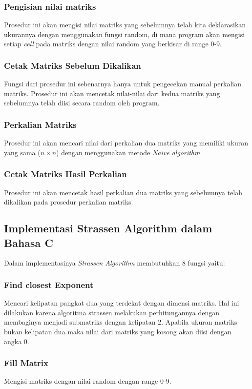 \documentclass[conference]{IEEEtran}
\begin{document}
\subsubsection{Pengisian nilai matriks}
Prosedur ini akan mengisi nilai matriks yang sebelumnya telah kita deklarasikan ukurannya dengan menggunakan fungsi random, 
di mana program akan mengisi setiap \textit{cell} pada matriks dengan nilai random yang berkisar di range 0-9.
\subsubsection{Cetak Matriks Sebelum Dikalikan}
Fungsi dari prosedur ini sebenarnya hanya untuk pengecekan manual perkalian matriks. 
Prosedur ini akan mencetak nilai-nilai dari kedua matriks yang sebelumnya telah diisi secara random oleh program.
\subsubsection{Perkalian Matriks}
Prosedur ini akan mencari nilai dari perkalian dua matriks yang memiliki ukuran yang sama ($n\times n$) dengan menggunakan metode \textit{Naive algorithm}.
\subsubsection{Cetak Matriks Hasil Perkalian}
Prosedur ini akan mencetak hasil perkalian dua matriks yang sebelumnya telah dikalikan pada prosedur perkalian matriks.

\subsection{Implementasi Strassen Algorithm dalam Bahasa C}
Dalam implementasinya \textit{Strassen Algorithm} membutuhkan 8 fungsi yaitu:

\subsubsection{Find closest Exponent} Mencari kelipatan pangkat dua yang terdekat dengan dimensi matriks. Hal ini dilakukan karena algoritma strassen melakukan
perhitungannya dengan membaginya menjadi submatriks dengan kelipatan 2. Apabila ukuran matriks bukan kelipatan dua maka nilai dari matriks yang kosong akan diisi dengan
angka 0.

\subsubsection{Fill Matrix} Mengisi matriks dengan nilai random dengan range 0-9.
\end{document}
